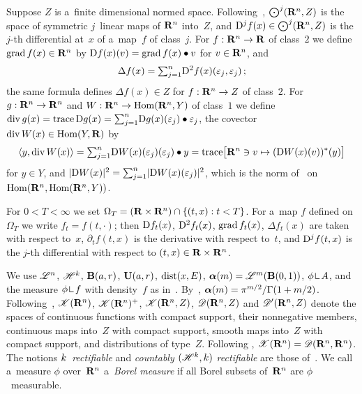 \documentclass[a4paper,twoside,leqno]{article}
\begin{document}
\begin{miniremark}
    Suppose $Z$ is a~finite dimensional normed space. Following~\cite[1.10.1,
    3.1.11]{Federer1969}, $\textstyle\bigodot^j(\mathbf{R}^{n},Z)$ is the space of symmetric $j$~linear
    maps of $\mathbf{R}^{n}$ into~$Z$, and $\mathrm{D}^j f(x) \in \textstyle\bigodot^j(\mathbf{R}^{n},Z)$ is the
    $j$-th differential at~$x$ of a~map~$f$ of class~$j$. For $f : \mathbf{R}^{n} \to \mathbf{R}$ of class~$2$
    we define $\operatorname{grad} f(x) \in \mathbf{R}^{n}$ by $\mathrm{D} f(x)(v) = \operatorname{grad} f(x) \bullet v$ for $v \in
    \mathbf{R}^{n}$, and
    \begin{displaymath}
        \Delta f(x) = {\textstyle\sum_{j=1}^{n}} \mathrm{D}^2 f(x)(\varepsilon_j,\varepsilon_j) \,;
    \end{displaymath}
    the same formula defines $\Delta f(x) \in Z$ for $f : \mathbf{R}^{n} \to Z$ of class~$2$. For $g :
    \mathbf{R}^{n} \to \mathbf{R}^{n}$ and $W : \mathbf{R}^{n} \to \operatorname{Hom}(\mathbf{R}^{n},Y)$ of class~$1$ we define
    $\mathrm{div}\, g(x) = \operatorname{trace} \mathrm{D} g(x) = {\textstyle\sum_{j=1}^{n}} \mathrm{D} g(x)(\varepsilon_j) \bullet
    \varepsilon_j$, the covector $\mathrm{div}\, W(x) \in \operatorname{Hom}(Y,\mathbf{R})$ by
    \begin{displaymath}
        \langle y, \mathrm{div}\, W(x) \rangle = {\textstyle\sum_{j=1}^{n}} \mathrm{D} W(x)(\varepsilon_j)
        (\varepsilon_j) \bullet y
        = \operatorname{trace} \bigl[ \mathbf{R}^{n} \ni v \mapsto (\mathrm{D} W(x)(v))^{*}(y) \bigr]
    \end{displaymath}
    for $y \in Y$,
    and $|\mathrm{D} W(x)|^2 = {\textstyle\sum_{j=1}^{n}} |\mathrm{D} W(x)(\varepsilon_j)|^2$, which is the norm
    of~\cite[1.7.9]{Federer1969} on~$\operatorname{Hom}(\mathbf{R}^{n},\operatorname{Hom}(\mathbf{R}^{n},Y))$.

    For $0 < T < \infty$ we set $\Omega_T = (\mathbf{R} \times \mathbf{R}^{n}) \cap \{ (t,x) : t < T \}$. For
    a~map $f$ defined on~$\Omega_T$ we write $f_t = f(t,\cdot)$; then $\mathrm{D} f_t(x)$, $\mathrm{D}^2 f_t(x)$,
    $\operatorname{grad} f_t(x)$, $\Delta f_t(x)$ are taken with respect to~$x$, $\partial_t f(t,x)$ is the
    derivative with respect to~$t$, and $\mathrm{D}^j f(t,x)$ is the $j$-th differential with respect to
    $(t,x) \in \mathbf{R} \times \mathbf{R}^{n}$.

    We use $\mathscr{L}^{n}$, $\mathscr{H}^{k}$, $\mathbf{B}(a,r)$, $\mathbf{U}(a,r)$, $\operatorname{dist}(x,E)$,
    $\boldsymbol{\alpha}(m) = \mathscr{L}^m(\mathbf{B}(0,1))$, $\phi \restrict A$, and the measure $\phi \restrict
    f$ with density~$f$ as in~\cite[2.4.10]{Federer1969}. By~\cite[2.7.16(1)]{Federer1969},
    $\boldsymbol{\alpha}(m) = \pi^{m/2} / \Gamma(1 + m/2)$. Following~\cite[2.5.14, 4.1.1]{Federer1969},
    $\mathscr{K}(\mathbf{R}^{n})$, $\mathscr{K}(\mathbf{R}^{n})^+$, $\mathscr{K}(\mathbf{R}^{n},Z)$,
    $\mathscr{D}(\mathbf{R}^{n},Z)$ and $\mathscr{D}'(\mathbf{R}^{n},Z)$ denote the spaces of continuous functions
    with compact support, their nonnegative members, continuous maps into~$Z$ with compact
    support, smooth maps into~$Z$ with compact support, and distributions of type~$Z$. Following
    \cite[2.5]{Allard1972}, $\mathscr{X}(\mathbf{R}^{n}) = \mathscr{D}(\mathbf{R}^{n},\mathbf{R}^{n})$. The notions
    \emph{$k$~rectifiable} and \emph{countably $(\mathscr{H}^{k},k)$ rectifiable} are those
    of~\cite[3.2.14]{Federer1969}. We call a~measure $\phi$ over~$\mathbf{R}^{n}$ a~\emph{Borel
    measure} if all Borel subsets of~$\mathbf{R}^{n}$ are $\phi$~measurable.
\end{miniremark}
\end{document}
